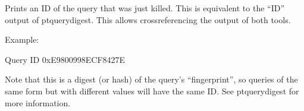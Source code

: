 \documentclass[letterpaper,10pt,english]{sphinxmanual}
\begin{document}

\begin{fulllineitems}
\label{\detokenize{mariadb-kill:cmdoption-mariadb-kill-query-id}}
Prints an ID of the query that was just killed. This is
equivalent to the “ID” output of pt\sphinxhyphen{}query\sphinxhyphen{}digest. This allows
cross\sphinxhyphen{}referencing the output of both tools.

Example:

\begin{sphinxVerbatim}[commandchars=\\\{\}]
Query ID 0xE9800998ECF8427E
\end{sphinxVerbatim}

Note that this is a digest (or hash) of the query’s “fingerprint”,
so queries of the same form but with different values will have the same ID.
See pt\sphinxhyphen{}query\sphinxhyphen{}digest for more information.

\end{fulllineitems}

\end{document}
